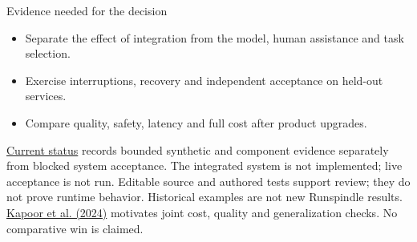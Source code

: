 \begin{frame}[label=argument-evidence]{Evidence needed for the decision}
\begin{itemize}
\item Separate the effect of integration from the model, human assistance and task selection.
\item Exercise interruptions, recovery and independent acceptance on held-out services.
\item Compare quality, safety, latency and full cost after product upgrades.
\end{itemize}
\medskip
\href{https://github.com/newdarwindev/runspindle/blob/main/STATUS.json}{Current status}
records bounded synthetic and component evidence separately from blocked system acceptance.
The integrated system is not implemented; live acceptance is not run.
\vfill
{\footnotesize Editable source and authored tests support review; they do not prove
runtime behavior. Historical examples are not new Runspindle results.
\href{https://arxiv.org/abs/2407.01502}{Kapoor et al. (2024)} motivates joint cost,
quality and generalization checks. No comparative win is claimed.}
\end{frame}
